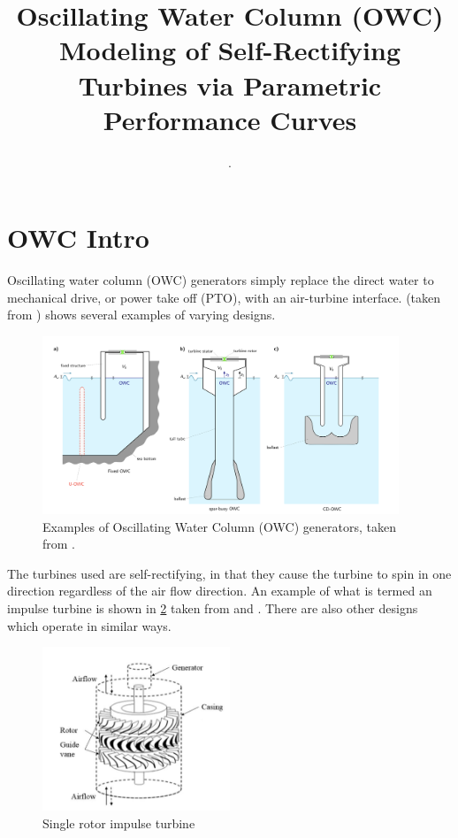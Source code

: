 \documentclass[conf]{new-aiaa}
\title{Oscillating Water Column (OWC) Modeling of Self-Rectifying Turbines via Parametric Performance Curves}
\author{.}
\begin{document}
%
\maketitle

\vspace{-11pt}

\section{OWC Intro}

Oscillating water column (OWC) generators simply replace the direct water to mechanical drive, or power take off (PTO), with an air-turbine interface.   (taken from \cite{Henriques:2016aa}) shows several examples of varying designs.  

\begin{figure}[H]
\centering
\vspace{-6pt}
\includegraphics[trim={0cm 0cm 0cm 0cm},clip,width=0.95\textwidth]{example_owc.png}
\vspace{-6pt}
\caption{Examples of Oscillating Water Column (OWC) generators, taken from \cite{Henriques:2016aa}.}
\label{fig:example_owc}
\end{figure}

The turbines used are self-rectifying, in that they cause the turbine to spin in one direction regardless of the air flow direction.  An example of what is termed an impulse turbine is shown in \cref{fig:single_impulse_turbine} taken from \cite{Setoguchi:2004aa} and \cite{Takao:2019aa}.  There are also other designs which operate in similar ways.

\begin{figure}[H]
\centering
\vspace{-6pt}
\includegraphics[trim={0cm 0cm 0cm 0cm},clip,width=0.5\textwidth]{single_impulse_turbine.png}
\vspace{-6pt}
\caption{Single rotor impulse turbine}
\label{fig:single_impulse_turbine}
\end{figure}
\end{document}
